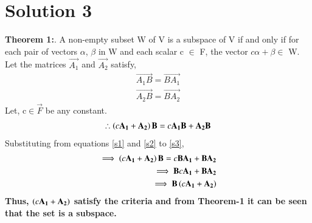 \documentclass[journal,12pt,twocolumn]{IEEEtran}
\begin{document}
\section{Solution 3}
\textbf{Theorem 1:}. A non-empty subset W of V is a subspace of V if and only if for each pair of vectors $\alpha$, $\beta$ in W and each scalar c $\in$ F, the vector $c\alpha+\beta \in$ W. \\
Let the matrices $\vec{A_1}$ and $\vec{A_2}$ satisfy,
\begin{align}
\vec{A_1B}=\vec{BA_1}\label{s1}\\
\vec{A_2B}=\vec{BA_2}\label{s2}
\end{align}
Let, c$\in \vec{F}$ be any constant.   
\begin{align}
\therefore \left(c\mathbf{A_1}+\mathbf{A_2}\right)\mathbf{B} = c\mathbf{A_1B} +\mathbf{A_2B}\label{s3}
\end{align}
Substituting from equations \eqref{s1} and \eqref{s2} to \eqref{s3},
\begin{align}
\implies \left(c\mathbf{A_1}+\mathbf{A_2}\right)\mathbf{B} = c\mathbf{BA_1} +\mathbf{BA_2}\\
\implies \mathbf{B}c\mathbf{A_1} +\mathbf{BA_2}\\
\implies \mathbf{B}\left(c\mathbf{A_1}+\mathbf{A_2}\right)
\end{align}
\textbf{Thus, $\left(c\mathbf{A_1}+\mathbf{A_2}\right)$ satisfy the criteria and from Theorem-1 it can be seen that the set is a subspace.} 
\end{document}
